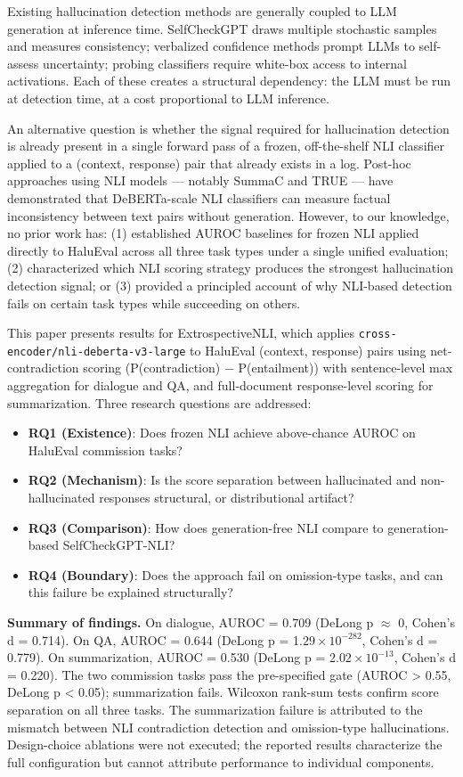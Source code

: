 
Existing hallucination detection methods are generally coupled to LLM generation at inference time. SelfCheckGPT \citep{Manakul2023SelfCheckGPT} draws multiple stochastic samples and measures consistency; verbalized confidence methods prompt LLMs to self-assess uncertainty; probing classifiers require white-box access to internal activations. Each of these creates a structural dependency: the LLM must be run at detection time, at a cost proportional to LLM inference.

An alternative question is whether the signal required for hallucination detection is already present in a single forward pass of a frozen, off-the-shelf NLI classifier applied to a (context, response) pair that already exists in a log. Post-hoc approaches using NLI models --- notably SummaC \citep{Laban2022SummaC} and TRUE \citep{Honovich2022TRUE} --- have demonstrated that DeBERTa-scale NLI classifiers can measure factual inconsistency between text pairs without generation. However, to our knowledge, no prior work has: (1) established AUROC baselines for frozen NLI applied directly to HaluEval across all three task types under a single unified evaluation; (2) characterized which NLI scoring strategy produces the strongest hallucination detection signal; or (3) provided a principled account of why NLI-based detection fails on certain task types while succeeding on others.

This paper presents results for ExtrospectiveNLI, which applies \texttt{cross-encoder/nli-deberta-v3-large} to HaluEval (context, response) pairs using net-contradiction scoring (P(contradiction) $-$ P(entailment)) with sentence-level max aggregation for dialogue and QA, and full-document response-level scoring for summarization. Three research questions are addressed:

\begin{itemize}
\item \textbf{RQ1 (Existence)}: Does frozen NLI achieve above-chance AUROC on HaluEval commission tasks?
\item \textbf{RQ2 (Mechanism)}: Is the score separation between hallucinated and non-hallucinated responses structural, or distributional artifact?
\item \textbf{RQ3 (Comparison)}: How does generation-free NLI compare to generation-based SelfCheckGPT-NLI?
\item \textbf{RQ4 (Boundary)}: Does the approach fail on omission-type tasks, and can this failure be explained structurally?
\end{itemize}

\textbf{Summary of findings.} On dialogue, AUROC = 0.709 (DeLong p $\approx$ 0, Cohen's d = 0.714). On QA, AUROC = 0.644 (DeLong p = 1.$29\times 10^{-282}$, Cohen's d = 0.779). On summarization, AUROC = 0.530 (DeLong p = 2.$02\times 10^{-13}$, Cohen's d = 0.220). The two commission tasks pass the pre-specified gate (AUROC > 0.55, DeLong p < 0.05); summarization fails. Wilcoxon rank-sum tests confirm score separation on all three tasks. The summarization failure is attributed to the mismatch between NLI contradiction detection and omission-type hallucinations. Design-choice ablations were not executed; the reported results characterize the full configuration but cannot attribute performance to individual components.
